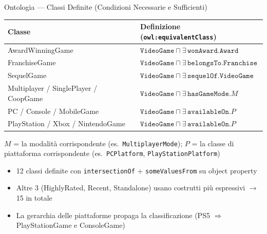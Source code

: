 \documentclass[aspectratio=169,11pt]{beamer}
\begin{document}
\begin{frame}{Ontologia --- Classi Definite (Condizioni Necessarie e Sufficienti)}
  \small
  \begin{tabular}{@{}ll@{}}
    \toprule
    \textbf{Classe} & \textbf{Definizione (\texttt{owl:equivalentClass})} \\
    \midrule
    AwardWinningGame     & $\texttt{VideoGame} \sqcap \exists\,\texttt{wonAward.Award}$ \\
    FranchiseGame        & $\texttt{VideoGame} \sqcap \exists\,\texttt{belongsTo.Franchise}$ \\
    SequelGame           & $\texttt{VideoGame} \sqcap \exists\,\texttt{sequelOf.VideoGame}$ \\
    Multiplayer / SinglePlayer / CoopGame & $\texttt{VideoGame} \sqcap \exists\,\texttt{hasGameMode}.M$ \\
    PC / Console / MobileGame & $\texttt{VideoGame} \sqcap \exists\,\texttt{availableOn}.P$ \\
    PlayStation / Xbox / NintendoGame & $\texttt{VideoGame} \sqcap \exists\,\texttt{availableOn}.P$ \\
    \bottomrule
  \end{tabular}

  \vspace{2pt}
  {\footnotesize $M$ = la modalit\`a corrispondente (es.\ \texttt{MultiplayerMode});
  $P$ = la classe di piattaforma corrispondente (es.\ \texttt{PCPlatform}, \texttt{PlayStationPlatform})\par}

  \vspace{6pt}

  \begin{itemize}
    \item 12 classi definite con \texttt{intersectionOf} + \texttt{someValuesFrom} su object property
    \item Altre 3 (HighlyRated, Recent, Standalone) usano costrutti pi\`u espressivi $\to$ 15 in totale
    \item La gerarchia delle piattaforme propaga la classificazione
      (PS5 $\Rightarrow$ PlayStationGame e ConsoleGame)
  \end{itemize}
\end{frame}
\end{document}
